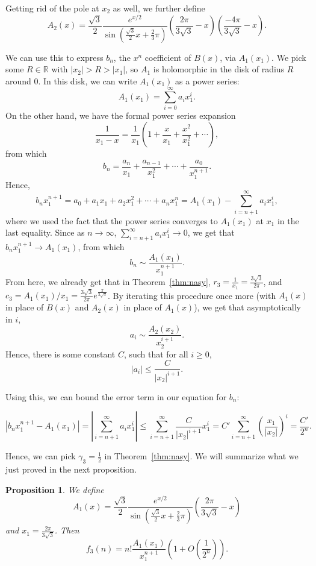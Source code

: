 \documentclass{amsart}
\newtheorem{proposition}[theorem]{Proposition}
\theoremstyle{definition}
\begin{document}
Getting rid of the pole at $x_2$ as well, we further define
\[A_2(x)=\frac{\sqrt{3}}{2}\frac{e^{x/2}}{\sin\left(\frac{\sqrt{3}}{2}x+\frac{2}{3}\pi\right)}\left(\frac{2\pi}{3\sqrt{3}}-x\right)\left(\frac{-4\pi}{3\sqrt{3}}-x\right).\]

We can use this to express $b_n$, the $x^n$ coefficient of $B(x)$, via $A_1(x_1)$. We pick some $R\in \mathbb{R}$ with $|x_2|>R>|x_1|$, so $A_1$ is holomorphic in the disk of radius $R$ around $0$. In this disk, we can write $A_1(x_1)$ as a power series:
\[A_1(x_1)=\sum_{i=0}^\infty a_i x_1^i.\]
On the other hand, we have the formal power series expansion
\[\frac{1}{x_1-x}=\frac{1}{x_1}\left(1+\frac{x}{x_1}+\frac{x^2}{x_1^2}+\cdots\right),\]
from which
\[b_n=\frac{a_n}{x_1}+\frac{a_{n-1}}{x_1^2}+\cdots+\frac{a_0}{x_1^{n+1}}.\]
Hence,
\[b_n x_1^{n+1}=a_0+a_1 x_1+ a_2 x_1^2+\cdots +a_n x_1^n=A_1(x_1)-\sum_{i=n+1}^{\infty}a_i x_1^i,\]
where we used the fact that the power series converges to $A_1(x_1)$ at $x_1$ in the last equality. Since as $n\to \infty$, $\sum_{i=n+1}^\infty a_i x_1^i\to 0$, we get that $b_n x_1^{n+1}\to A_1(x_1)$, from which 
\[b_n\sim \frac{A_1(x_1)}{x_1^{n+1}}.\]
From here, we already get that in Theorem~\ref{thm:nasy}, $r_3=\frac{1}{x_1}=\frac{3\sqrt{3}}{2\pi}$, and $c_3=A_1(x_1)/x_1=\frac{3\sqrt{3}}{2\pi}e^{\frac{\pi}{3\sqrt{3}}}$. By iterating this procedure once more (with $A_1(x)$ in place of $B(x)$ and $A_2(x)$ in place of $A_1(x)$), we get that asymptotically in $i$,
\[a_i\sim \frac{A_2(x_2)}{x_2^{i+1}}.\]
Hence, there is some constant $C$, such that for all $i\geq 0$,
\[|a_i|\leq \frac{C}{|x_2|^{i+1}}.\]

Using this, we can bound the error term in our equation for $b_n$:

\[|b_n x_1^{n+1}-A_1(x_1)|=\left\lvert\sum_{i=n+1}^{\infty}a_i x_1^{i}\right\rvert\leq \sum_{i=n+1}^\infty \frac{C}{|x_2|^{i+1}}x_1^{i}=C' \sum_{i=n+1}^\infty \left(\frac{x_1}{|x_2|}\right)^i=\frac{C'}{2^n}.\]

Hence, we can pick $\gamma_3=\frac{1}{2}$ in Theorem~\ref{thm:nasy}. We will summarize what we just proved in the next proposition.

\begin{proposition}
We define 
\[A_1(x)=\frac{\sqrt{3}}{2}\frac{e^{x/2}}{\sin\left(\frac{\sqrt{3}}{2}x+\frac{2}{3}\pi\right)}\left(\frac{2\pi}{3\sqrt{3}}-x\right)\]
and $x_1=\frac{2\pi}{3\sqrt{3}}$. Then
\[f_3(n)=n!\frac{A_1(x_1)}{x_1^{n+1}}\left(1+O\left(\frac{1}{2^n}\right)\right).\]
\end{proposition}
\end{document}
